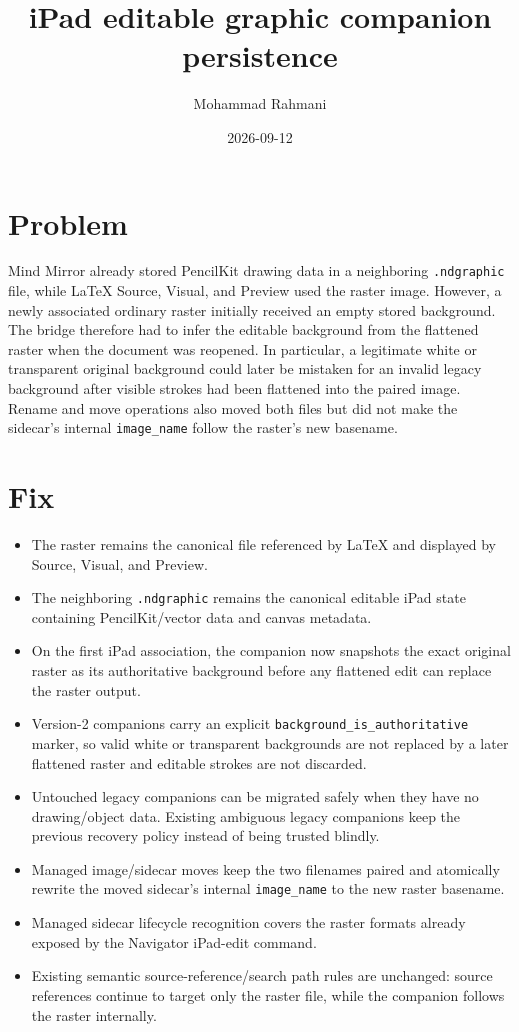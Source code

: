 \documentclass[a4paper]{article}
\title{iPad editable graphic companion persistence}
\date{2026-09-12}
\author{Mohammad Rahmani}
\begin{document}
\maketitle

\section{Problem}
Mind Mirror already stored PencilKit drawing data in a neighboring
\texttt{.ndgraphic} file, while LaTeX Source, Visual, and Preview used the raster
image. However, a newly associated ordinary raster initially received an empty
stored background. The bridge therefore had to infer the editable background
from the flattened raster when the document was reopened. In particular, a
legitimate white or transparent original background could later be mistaken for
an invalid legacy background after visible strokes had been flattened into the
paired image. Rename and move operations also moved both files but did not make
the sidecar's internal \texttt{image\_name} follow the raster's new basename.

\section{Fix}
\begin{itemize}
   \item The raster remains the canonical file referenced by LaTeX and displayed by Source, Visual, and Preview.
   \item The neighboring \texttt{.ndgraphic} remains the canonical editable iPad state containing PencilKit/vector data and canvas metadata.
   \item On the first iPad association, the companion now snapshots the exact original raster as its authoritative background before any flattened edit can replace the raster output.
   \item Version-2 companions carry an explicit \texttt{background\_is\_authoritative} marker, so valid white or transparent backgrounds are not replaced by a later flattened raster and editable strokes are not discarded.
   \item Untouched legacy companions can be migrated safely when they have no drawing/object data. Existing ambiguous legacy companions keep the previous recovery policy instead of being trusted blindly.
   \item Managed image/sidecar moves keep the two filenames paired and atomically rewrite the moved sidecar's internal \texttt{image\_name} to the new raster basename.
   \item Managed sidecar lifecycle recognition covers the raster formats already exposed by the Navigator iPad-edit command.
   \item Existing semantic source-reference/search path rules are unchanged: source references continue to target only the raster file, while the companion follows the raster internally.
\end{itemize}
\end{document}
